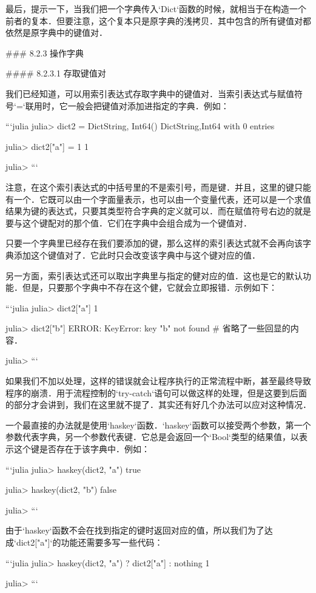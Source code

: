 最后，提示一下，当我们把一个字典传入`Dict`函数的时候，就相当于在构造一个前者的复本．但要注意，这个复本只是原字典的浅拷贝．其中包含的所有键值对都依然是原字典中的键值对．

### 8.2.3 操作字典

#### 8.2.3.1 存取键值对

我们已经知道，可以用索引表达式存取字典中的键值对．当索引表达式与赋值符号`=`联用时，它一般会把键值对添加进指定的字典．例如：

```julia
julia> dict2 = Dict{String, Int64}()
Dict{String,Int64} with 0 entries

julia> dict2["a"] = 1
1

julia> 
```

注意，在这个索引表达式的中括号里的不是索引号，而是键．并且，这里的键只能有一个．它既可以由一个字面量表示，也可以由一个变量代表，还可以是一个求值结果为键的表达式，只要其类型符合字典的定义就可以．而在赋值符号右边的就是要与这个键配对的那个值．它们在字典中会组合成为一个键值对．

只要一个字典里已经存在我们要添加的键，那么这样的索引表达式就不会再向该字典添加这个键值对了．它此时只会改变该字典中与这个键对应的值．

另一方面，索引表达式还可以取出字典里与指定的健对应的值．这也是它的默认功能．但是，只要那个字典中不存在这个健，它就会立即报错．示例如下：

```julia
julia> dict2["a"]
1

julia> dict2["b"]
ERROR: KeyError: key "b" not found
# 省略了一些回显的内容．

julia> 
```

如果我们不加以处理，这样的错误就会让程序执行的正常流程中断，甚至最终导致程序的崩溃．用于流程控制的`try-catch`语句可以做这样的处理，但是这要到后面的部分才会讲到，我们在这里就不提了．其实还有好几个办法可以应对这种情况．

一个最直接的办法就是使用`haskey`函数．`haskey`函数可以接受两个参数，第一个参数代表字典，另一个参数代表键．它总是会返回一个`Bool`类型的结果值，以表示这个键是否存在于该字典中．例如：

```julia
julia> haskey(dict2, "a")
true

julia> haskey(dict2, "b")
false

julia>
```

由于`haskey`函数不会在找到指定的键时返回对应的值，所以我们为了达成`dict2["a"]`的功能还需要多写一些代码：

```julia
julia> haskey(dict2, "a") ? dict2["a"] : nothing
1

julia> 
```

